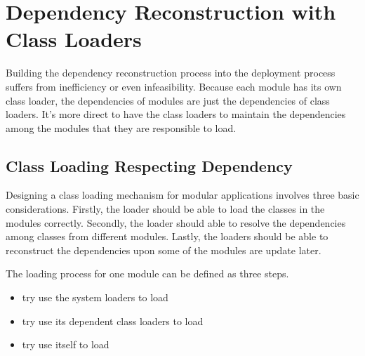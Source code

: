 \documentclass[conference]{IEEEtran}
\begin{document}



 
 
\section{Dependency Reconstruction with Class Loaders\label{sec:reconstructionCL}}

Building the dependency reconstruction process into the deployment process suffers from inefficiency or even infeasibility. 
Because each module has its own class loader, the dependencies of modules are just the dependencies of class loaders. 
It's more direct to have the class loaders to maintain the dependencies among the modules that they are responsible to load. 


\subsection{Class Loading Respecting Dependency}

Designing a class loading mechanism for modular applications involves three basic considerations. Firstly, the loader should be able to load the classes in the modules correctly. Secondly, the loader should able to resolve the dependencies among classes from different modules. Lastly, the loaders should be able to reconstruct the dependencies upon some of the modules are update later.

The loading process for one module can be defined as three steps. 
\begin{itemize}
\item try use the system loaders to load
\item try use its dependent class loaders to load
\item try use itself to load
\end{itemize}
\end{document}
